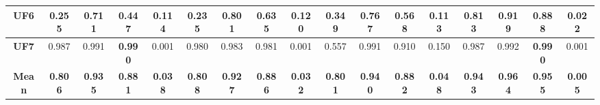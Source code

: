 \begin{table*}
\begin{tabular}{|c|c|c|c|c|c|c|c|c|c|c|c|c|c|c|c|c|}
\hline
\textbf{UF6}          & 0.255           & 0.711           & 0.447           & 0.114           & 0.235           & 0.801           & 0.635           & 0.120           & 0.349           & 0.767           & 0.568           & 0.113           & 0.813           & 0.919           & \textbf{0.888 } & 0.022            \\ 
\hline
\textbf{UF7}          & 0.987           & 0.991           & \textbf{0.990 } & 0.001           & 0.980           & 0.983           & 0.981           & 0.001           & 0.557           & 0.991           & 0.910           & 0.150           & 0.987           & 0.992           & \textbf{0.990 } & 0.001            \\ 
\hline
\textbf{Mean}         & \textbf{0.806}  & \textbf{0.935}  & \textbf{0.881}  & \textbf{0.038}  & \textbf{0.808}  & \textbf{0.927}  & \textbf{0.886}  & \textbf{0.032}  & \textbf{0.801}  & \textbf{0.940}  & \textbf{0.882}  & \textbf{0.048}  & \textbf{0.943}  & \textbf{0.964}  & \textbf{0.955}  & \textbf{0.005}   \\
\hline
\end{tabular}
\end{table*}

